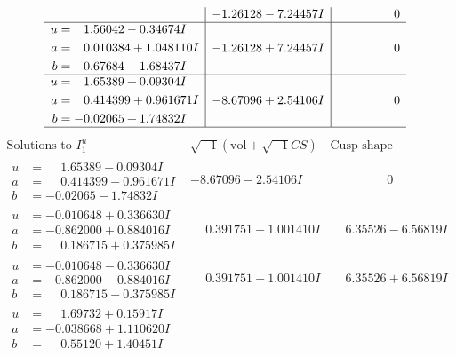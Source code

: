 \documentclass[1p]{elsarticle_modified}
\theoremstyle{definition}
\newcommand{\I}{\sqrt{-1}}
\begin{document}
$$\begin{array}{c|c|c}
 & -1.26128 - 7.24457 I & \phantom{-0.000000 } 0 \\ \hline\begin{aligned}
u &= \phantom{-}1.56042 - 0.34674 I \\
a &= \phantom{-}0.010384 + 1.048110 I \\
b &= \phantom{-}0.67684 + 1.68437 I\end{aligned}
 & -1.26128 + 7.24457 I & \phantom{-0.000000 } 0 \\ \hline\begin{aligned}
u &= \phantom{-}1.65389 + 0.09304 I \\
a &= \phantom{-}0.414399 + 0.961671 I \\
b &= -0.02065 + 1.74832 I\end{aligned}
 & -8.67096 + 2.54106 I & \phantom{-0.000000 } 0\\
 \hline 
 \end{array}$$\newpage$$\begin{array}{c|c|c}  
\text{Solutions to }I^u_{1}& \I (\text{vol} + \sqrt{-1}CS) & \text{Cusp shape}\\
 \hline 
\begin{aligned}
u &= \phantom{-}1.65389 - 0.09304 I \\
a &= \phantom{-}0.414399 - 0.961671 I \\
b &= -0.02065 - 1.74832 I\end{aligned}
 & -8.67096 - 2.54106 I & \phantom{-0.000000 } 0 \\ \hline\begin{aligned}
u &= -0.010648 + 0.336630 I \\
a &= -0.862000 + 0.884016 I \\
b &= \phantom{-}0.186715 + 0.375985 I\end{aligned}
 & \phantom{-}0.391751 + 1.001410 I & \phantom{-}6.35526 - 6.56819 I \\ \hline\begin{aligned}
u &= -0.010648 - 0.336630 I \\
a &= -0.862000 - 0.884016 I \\
b &= \phantom{-}0.186715 - 0.375985 I\end{aligned}
 & \phantom{-}0.391751 - 1.001410 I & \phantom{-}6.35526 + 6.56819 I \\ \hline\begin{aligned}
u &= \phantom{-}1.69732 + 0.15917 I \\
a &= -0.038668 + 1.110620 I \\
b &= \phantom{-}0.55120 + 1.40451 I\end{aligned}

\end{array}$$
\end{document}
